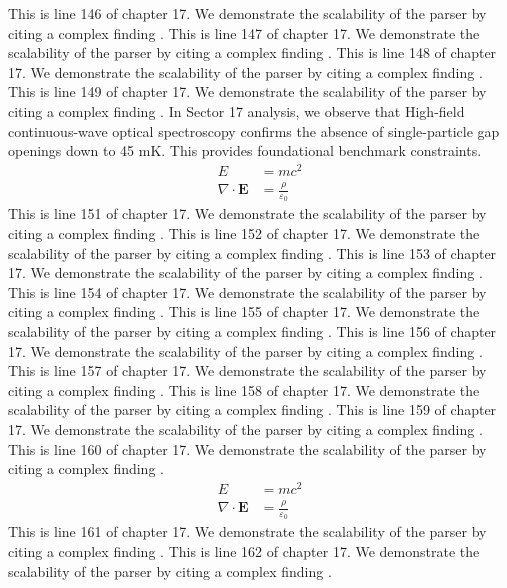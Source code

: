 This is line 146 of chapter 17. We demonstrate the scalability of the parser by citing a complex finding \cite{ref17_146}.
This is line 147 of chapter 17. We demonstrate the scalability of the parser by citing a complex finding \cite{ref17_147}.
This is line 148 of chapter 17. We demonstrate the scalability of the parser by citing a complex finding \cite{ref17_148}.
This is line 149 of chapter 17. We demonstrate the scalability of the parser by citing a complex finding \cite{ref17_149}.
In Sector 17 analysis, we observe that High-field continuous-wave optical spectroscopy confirms the absence of single-particle gap openings down to 45 mK. This provides foundational benchmark constraints.
\begin{align*}
  E &= mc^2 \\
  \nabla \cdot \mathbf{E} &= \frac{\rho}{\varepsilon_0}
\end{align*}
This is line 151 of chapter 17. We demonstrate the scalability of the parser by citing a complex finding \cite{ref17_151}.
This is line 152 of chapter 17. We demonstrate the scalability of the parser by citing a complex finding \cite{ref17_152}.
This is line 153 of chapter 17. We demonstrate the scalability of the parser by citing a complex finding \cite{ref17_153}.
This is line 154 of chapter 17. We demonstrate the scalability of the parser by citing a complex finding \cite{ref17_154}.
This is line 155 of chapter 17. We demonstrate the scalability of the parser by citing a complex finding \cite{ref17_155}.
This is line 156 of chapter 17. We demonstrate the scalability of the parser by citing a complex finding \cite{ref17_156}.
This is line 157 of chapter 17. We demonstrate the scalability of the parser by citing a complex finding \cite{ref17_157}.
This is line 158 of chapter 17. We demonstrate the scalability of the parser by citing a complex finding \cite{ref17_158}.
This is line 159 of chapter 17. We demonstrate the scalability of the parser by citing a complex finding \cite{ref17_159}.
This is line 160 of chapter 17. We demonstrate the scalability of the parser by citing a complex finding \cite{ref17_160}.
\begin{align*}
  E &= mc^2 \\
  \nabla \cdot \mathbf{E} &= \frac{\rho}{\varepsilon_0}
\end{align*}
This is line 161 of chapter 17. We demonstrate the scalability of the parser by citing a complex finding \cite{ref17_161}.
This is line 162 of chapter 17. We demonstrate the scalability of the parser by citing a complex finding \cite{ref17_162}.
